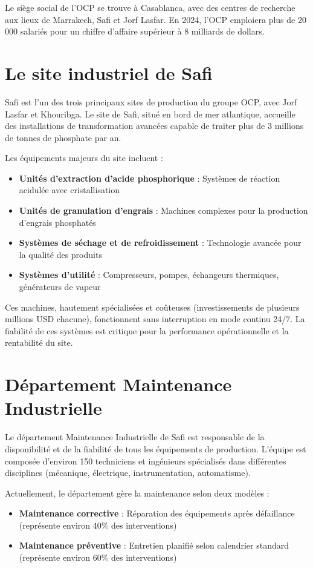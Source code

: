 \documentclass[a4paper,12pt,twoside]{report}
\begin{document}
Le siège social de l'OCP se trouve à Casablanca, avec des centres de recherche aux lieux de Marrakech, Safi et Jorf Lasfar. En 2024, l’OCP emploiera plus de 20\,000 salariés pour un chiffre d’affaire supérieur à 8 milliards de dollars.

\section{Le site industriel de Safi}

Safi est l'un des trois principaux sites de production du groupe OCP, avec Jorf Lasfar et Khouribga. Le site de Safi, situé en bord de mer atlantique, accueille des installations de transformation avancées capable de traiter plus de 3 millions de tonnes de phosphate par an.

Les équipements majeurs du site incluent :
\begin{itemize}
    \item \textbf{Unités d'extraction d'acide phosphorique} : Systèmes de réaction acidulée avec cristallisation
    \item \textbf{Unités de granulation d'engrais} : Machines complexes pour la production d'engrais phosphatés
    \item \textbf{Systèmes de séchage et de refroidissement} : Technologie avancée pour la qualité des produits
    \item \textbf{Systèmes d'utilité} : Compresseurs, pompes, échangeurs thermiques, générateurs de vapeur
\end{itemize}

Ces machines, hautement spécialisées et coûteuses (investissements de plusieurs millions USD chacune), fonctionnent sans interruption en mode continu 24/7. La fiabilité de ces systèmes est critique pour la performance opérationnelle et la rentabilité du site.

\section{Département Maintenance Industrielle}

Le département Maintenance Industrielle de Safi est responsable de la disponibilité et de la fiabilité de tous les équipements de production. L'équipe est composée d'environ 150 techniciens et ingénieurs spécialisés dans différentes disciplines (mécanique, électrique, instrumentation, automatisme).

Actuellement, le département gère la maintenance selon deux modèles :
\begin{itemize}
    \item \textbf{Maintenance corrective} : Réparation des équipements après défaillance (représente environ 40\% des interventions)
    \item \textbf{Maintenance préventive} : Entretien planifié selon calendrier standard (représente environ 60\% des interventions)
\end{itemize}
\end{document}
